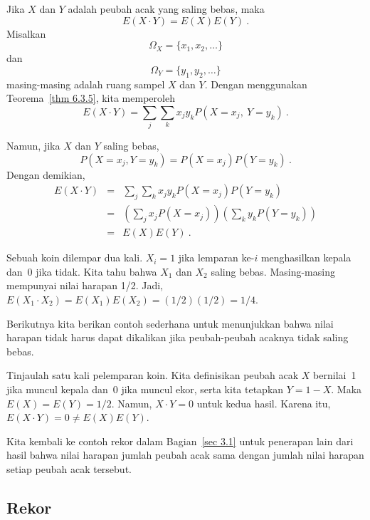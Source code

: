 \begin{theorem}\label{thm 6.4} Jika $X$ dan $Y$ adalah peubah acak yang saling bebas,
maka
$$ E(X \cdot Y) = E(X)E(Y)\ .
$$
\proof Misalkan
$$\Omega_X = \{x_1, x_2, \ldots\}$$ dan
$$\Omega_Y = \{y_1, y_2, \ldots\}$$ masing-masing adalah ruang sampel $X$ dan $Y$.
Dengan menggunakan Teorema~\ref{thm 6.3.5}, kita memperoleh
$$ E(X \cdot Y) = \sum_j \sum_k x_jy_k P(X = x_j,\ Y = y_k)\ .
$$

Namun, jika $X$ dan $Y$ saling bebas,
$$ P(X = x_j, Y = y_k) = P(X = x_j)P(Y = y_k)\ .
$$ Dengan demikian,
\begin{eqnarray*} E(X \cdot Y) & = & \sum_j\sum_k x_j y_k P(X = x_j) P(Y = y_k) \\
             & = & \left(\sum_j x_j P(X = x_j)\right) \left(\sum_k y_k P(Y =
y_k)\right) \\
             & = &E(X) E(Y)\ .
\end{eqnarray*}
\end{theorem}

\begin{example}\label{exam 6.3} Sebuah koin dilempar dua kali. $X_i = 1$ jika
lemparan ke-$i$ menghasilkan kepala dan~0 jika tidak. Kita tahu bahwa $X_1$ dan $X_2$
saling bebas. Masing-masing mempunyai nilai harapan 1/2. Jadi,
$E(X_1 \cdot X_2) = E(X_1) E(X_2) = (1/2)(1/2) = 1/4$.
\end{example}

Berikutnya kita berikan contoh sederhana untuk menunjukkan bahwa nilai harapan tidak
harus dapat dikalikan jika peubah-peubah acaknya tidak saling bebas.

\begin{example}\label{exam 6.4} Tinjaulah satu kali pelemparan koin. Kita definisikan
peubah acak $X$ bernilai~1 jika muncul kepala dan~0 jika muncul ekor, serta kita
tetapkan $Y = 1 - X$. Maka $E(X) = E(Y) = 1/2$. Namun, $X \cdot Y = 0$ untuk kedua
hasil. Karena itu, $E(X \cdot Y) = 0 \ne E(X) E(Y)$.
\end{example}

Kita kembali ke contoh rekor dalam Bagian~\ref{sec 3.1} untuk penerapan lain dari
hasil bahwa nilai harapan jumlah peubah acak sama dengan jumlah nilai harapan setiap
peubah acak tersebut.

\subsection*{Rekor}

